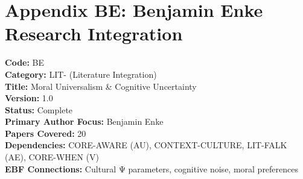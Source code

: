 
\chapter*{Appendix BE: Benjamin Enke Research Integration}
\label{app:enke}

\begin{tcolorbox}[colback=blue!5!white, colframe=blue!75!black, title=Appendix Metadata]
\textbf{Code:} BE \\
\textbf{Category:} LIT- (Literature Integration) \\
\textbf{Title:} Moral Universalism \& Cognitive Uncertainty \\
\textbf{Version:} 1.0 \\
\textbf{Status:} Complete \\
\textbf{Primary Author Focus:} Benjamin Enke \\
\textbf{Papers Covered:} 20 \\
\textbf{Dependencies:} CORE-AWARE (AU), CONTEXT-CULTURE, LIT-FALK (AE), CORE-WHEN (V) \\
\textbf{EBF Connections:} Cultural Ψ parameters, cognitive noise, moral preferences
\end{tcolorbox}

